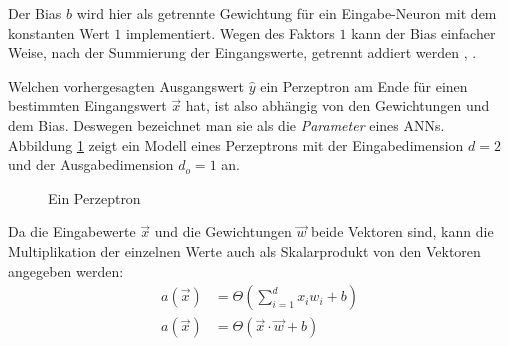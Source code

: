 \documentclass[12pt,titlepage]{article}
\begin{document}
Der Bias \(b\) wird hier als getrennte Gewichtung für ein Eingabe-Neuron mit dem konstanten Wert $1$ implementiert. Wegen des Faktors \(1\) kann der Bias einfacher Weise, nach der Summierung der Eingangswerte, getrennt addiert werden \autocite[4-5]{abdiNeuralNetworkPrimer1994}, \autocite[3]{suzukiArtificialNeuralNetworks2011}.

Welchen vorhergesagten Ausgangswert \(\hat{y}\) ein Perzeptron am Ende für einen bestimmten Eingangswert $\vec{x}$ hat, ist also abhängig von den Gewichtungen und dem Bias. Deswegen bezeichnet man sie als die \textit{Parameter} eines ANNs. Abbildung \ref{fig:perzeptron} zeigt ein Modell eines Perzeptrons mit der Eingabedimension $d=2$ und der Ausgabedimension $d_o=1$ an.

\begin{figure}[H]
  \centering


  \caption{Ein Perzeptron}
  \label{fig:perzeptron}
\end{figure}

Da die Eingabewerte \(\vec{x}\) und die Gewichtungen \(\vec{w}\) beide Vektoren sind, kann die Multiplikation der einzelnen Werte auch als Skalarprodukt von den Vektoren angegeben werden:
\begin{align*}
  a(\vec{x}) & = \Theta \left( \sum_{i=1}^{d} x_i w_i +b \right) \\
  a(\vec{x}) & = \Theta ( \vec{x} \cdot \vec{w} + b )
\end{align*}
\end{document}
